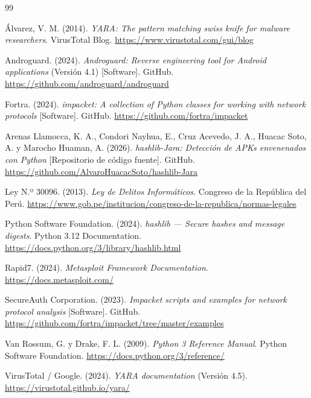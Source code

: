 \documentclass[12pt,a4paper]{article}
\begin{document}
\begin{thebibliography}{99}

Álvarez, V. M. (2014). \textit{YARA: The pattern matching swiss knife for
  malware researchers}. VirusTotal Blog.
  \url{https://www.virustotal.com/gui/blog}

Androguard. (2024). \textit{Androguard: Reverse engineering tool for Android
  applications} (Versión 4.1) [Software]. GitHub.
  \url{https://github.com/androguard/androguard}

Fortra. (2024). \textit{impacket: A collection of Python classes for working
  with network protocols} [Software]. GitHub.
  \url{https://github.com/fortra/impacket}

Arenas Llamocca, K. A., Condori Nayhua, E., Cruz Acevedo, J. A., Huacac Soto, A. y
  Marocho Huaman, A. (2026). \textit{hashlib-Jara: Detección de APKs envenenados
  con Python} [Repositorio de código fuente]. GitHub.
  \url{https://github.com/AlvaroHuacacSoto/hashlib-Jara}

Ley N.º 30096. (2013). \textit{Ley de Delitos Informáticos}. Congreso de la
  República del Perú. \url{https://www.gob.pe/institucion/congreso-de-la-republica/normas-legales}

Python Software Foundation. (2024). \textit{hashlib --- Secure hashes and
  message digests}. Python 3.12 Documentation.
  \url{https://docs.python.org/3/library/hashlib.html}

Rapid7. (2024). \textit{Metasploit Framework Documentation}.
  \url{https://docs.metasploit.com/}

SecureAuth Corporation. (2023). \textit{Impacket scripts and examples for
  network protocol analysis} [Software]. GitHub.
  \url{https://github.com/fortra/impacket/tree/master/examples}

Van Rossum, G. y Drake, F. L. (2009). \textit{Python 3 Reference Manual}.
  Python Software Foundation. \url{https://docs.python.org/3/reference/}

VirusTotal / Google. (2024). \textit{YARA documentation} (Versión 4.5).
  \url{https://virustotal.github.io/yara/}

\end{thebibliography}
\end{document}
